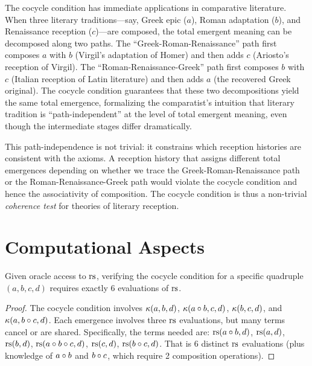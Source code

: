 \begin{remark}\label{rem:ch2:cocycle_comparative}
The cocycle condition has immediate applications in comparative literature.
When three literary traditions---say, Greek epic ($a$), Roman adaptation
($b$), and Renaissance reception ($c$)---are composed, the total emergent
meaning can be decomposed along two paths. The ``Greek-Roman-Renaissance''
path first composes $a$ with $b$ (Virgil's adaptation of Homer) and then
adds $c$ (Ariosto's reception of Virgil). The ``Roman-Renaissance-Greek''
path first composes $b$ with $c$ (Italian reception of Latin literature)
and then adds $a$ (the recovered Greek original). The cocycle condition
guarantees that these two decompositions yield the same total emergence,
formalizing the comparatist's intuition that literary tradition is
``path-independent'' at the level of total emergent meaning, even though
the intermediate stages differ dramatically.

This path-independence is not trivial: it constrains which reception
histories are consistent with the axioms. A reception history that
assigns different total emergences depending on whether we trace the
Greek-Roman-Renaissance path or the Roman-Renaissance-Greek path would
violate the cocycle condition and hence the associativity of composition.
The cocycle condition is thus a non-trivial \emph{coherence test} for
theories of literary reception.
\end{remark}

\section{Computational Aspects}

\begin{proposition}
Given oracle access to $\mathrm{rs}$, verifying the cocycle condition for a
specific quadruple $(a,b,c,d)$ requires exactly 6 evaluations of $\mathrm{rs}$.
\end{proposition}
\begin{proof}
The cocycle condition involves $\kappa(a,b,d)$, $\kappa(a \circ b,
c, d)$, $\kappa(b,c,d)$, and $\kappa(a, b \circ c, d)$. Each
emergence involves three $\mathrm{rs}$ evaluations, but many terms cancel or
are shared. Specifically, the terms needed are: $\mathrm{rs}(a \circ b, d)$,
$\mathrm{rs}(a, d)$, $\mathrm{rs}(b, d)$, $\mathrm{rs}(a \circ b \circ c, d)$,
$\mathrm{rs}(c, d)$, $\mathrm{rs}(b \circ c, d)$. That is 6 distinct $\mathrm{rs}$
evaluations (plus knowledge of $a \circ b$ and $b \circ c$, which
require 2 composition operations).
\end{proof}

